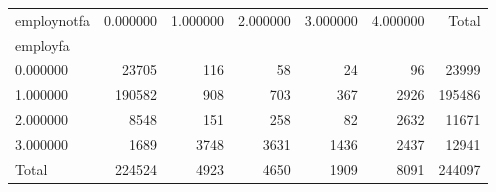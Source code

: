 \begin{tabular}{lrrrrrr}
\toprule
employnotfa & 0.000000 & 1.000000 & 2.000000 & 3.000000 & 4.000000 & Total \\
employfa &  &  &  &  &  &  \\
\midrule
0.000000 & 23705 & 116 & 58 & 24 & 96 & 23999 \\
1.000000 & 190582 & 908 & 703 & 367 & 2926 & 195486 \\
2.000000 & 8548 & 151 & 258 & 82 & 2632 & 11671 \\
3.000000 & 1689 & 3748 & 3631 & 1436 & 2437 & 12941 \\
Total & 224524 & 4923 & 4650 & 1909 & 8091 & 244097 \\
\bottomrule
\end{tabular}
